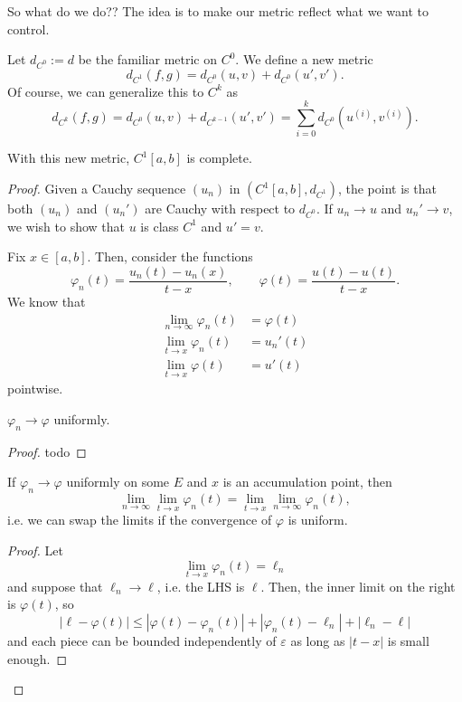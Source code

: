 \documentclass[10pt]{scrartcl}
\providecommand{\eps}{\varepsilon}
\begin{document}
So what do we do??
The idea is to make our metric reflect what we want to control.
\begin{definition}[$C^1$ metric]\label{wk11:def:C1-metric}
	Let $d_{C^0} := d$ be the familiar metric on $C^0$.
	We define a new metric
	\[d_{C^1}(f, g) = d_{C^0}(u, v) + d_{C^0}(u', v').\]
	Of course, we can generalize this to $C^k$ as
	\[d_{C^k}(f, g) = d_{C^0}(u, v) + d_{C^{k-1}}(u', v')
	= \sum_{i=0}^k d_{C^0}(u^{(i)} , v^{(i)}).\]
\end{definition}

\begin{theorem}\label{wk11:thm:new-Ck-complete}
	With this new metric, $C^1[a,b]$ is complete.
\end{theorem}

\begin{proof}
	Given a Cauchy sequence $(u_n)$ in $(C^1[a,b], d_{C^1})$, the point is that
	both $(u_n)$ and $(u_n')$ are Cauchy with respect to $d_{C^0}$.
	If $u_n\to u$ and $u_n'\to v$, we wish to show that
	$u$ is class $C^1$ and $u' = v$.
	
	Fix $x\in[a,b]$. Then, consider the functions
	\[\varphi_n(t) = \frac{u_n(t) - u_n(x)}{t - x},\qquad
	\varphi(t) = \frac{u(t) - u(t)}{t - x}.\]
	We know that
	\begin{align*}
		\lim_{n\to\infty} \varphi_n(t) &= \varphi(t)\\
		\lim_{t\to x} \varphi_n(t) &= u_n'(t)\\
		\lim_{t\to x} \varphi(t) &= u'(t)
	\end{align*}
	pointwise.
	
	\begin{claim}
		$\varphi_n\to \varphi$ uniformly.
	\end{claim}
	\begin{proof}
		todo
	\end{proof}
	
	\begin{claim}
		If $\varphi_n\to\varphi$ uniformly on some $E$
		and $x$ is an accumulation point, then
		\[\lim_{n\to\infty} \lim_{t\to x} \varphi_n(t) =
		\lim_{t\to x} \lim_{n\to\infty} \varphi_n(t),\]
		i.e. we can swap the limits
		if the convergence of $\varphi$ is uniform.
	\end{claim}
	\begin{proof}
		Let
		\[\lim_{t\to x }\varphi_n(t) = \ell_n\]
		and suppose that $\ell_n\to\ell$, i.e. the LHS is $\ell$.
		Then, the inner limit on the right is $\varphi(t)$, so
		\[|\ell - \varphi(t)| \le
		|\varphi(t) - \varphi_n(t)| + |\varphi_n(t) - \ell_n| + |\ell_n - \ell|\]
		and each piece can be bounded independently of $\eps$
		as long as $|t - x|$ is small enough.
	\end{proof}
\end{proof}
\end{document}
